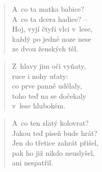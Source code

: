 \begin{verse}
A~co ta matka babice? \\
A~co ta dcera hadice? -- \\
Hoj, vyjí čtyři vlci v~lese, \\
každý po jedné noze nese \\
ze dvou ženských těl.
\end{verse}

\begin{verse}
Z~hlavy jim oči vyňaty, \\
ruce i nohy uťaty: \\
co prve panně udělaly, \\
toho teď na se dočekaly \\
v~lese hlubokém.
\end{verse}

\begin{verse}
A~co ten zlatý kolovrat? \\
Jakou teď píseň bude hrát? \\
Jen do třetice zahrát přišel, \\
pak ho již nikdo neuslyšel, \\
ani nespatřil.
\end{verse}